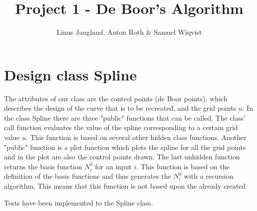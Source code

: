 \documentclass[a4paper]{article}
\title{Project 1 - De Boor's Algorithm}
\author{Linus Jangland, Anton Roth & Samuel Wiqvist}
\begin{document}
\section{Design class Spline}
The attributes of our class are the control points (de Boor points), which describes the design of the curve that is to be recreated, and the grid points $u$. In the class Spline there are three "public" functions that can be called. The class' call function evaluates the value of the spline corresponding to a certain grid value $u$. This function is based on several other hidden class functions. Another "public" function is a plot function which plots the spline for all the grid points and in the plot are also the control points drawn. The last unhidden function returns the basis function $N_i^3$ for an input $i$. This function is based on the definition of the basis functions and thus generates the $N_i^3$ with a recursion algorithm. This means that this function is not based upon the already created 

Tests have been implemented to the Spline class.  
\end{document}
